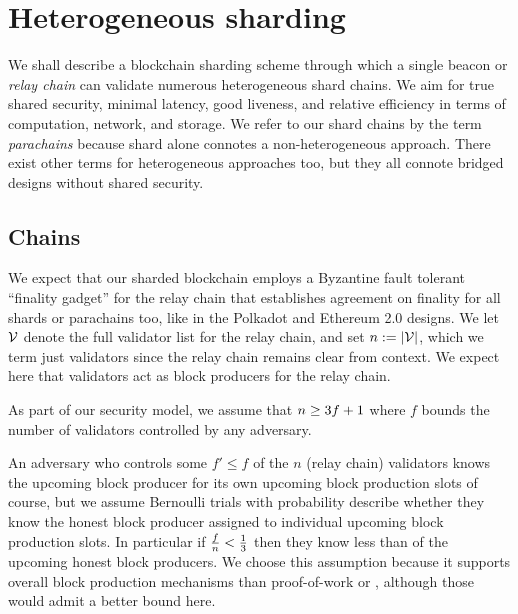 
\section{Heterogeneous sharding}

We shall describe a blockchain sharding scheme through which a single beacon or {\em relay chain} can validate numerous heterogeneous shard chains.  We aim for true shared security, minimal latency, good liveness, and relative efficiency in terms of computation, network, and storage.  We refer to our shard chains by the term {\em parachains} because shard alone connotes a non-heterogeneous approach.  There exist other terms for heterogeneous approaches too, but they all connote bridged designs without shared security.

\subsection{Chains}

We expect that our sharded blockchain employs a Byzantine fault tolerant ``finality gadget'' for the relay chain that establishes agreement on finality for all shards or parachains too, like in the Polkadot and Ethereum 2.0 designs.  We let $\mathcal{V}$ denote the full validator list for the relay chain, and set $n := |\mathcal{V}|$, which we term just validators since the relay chain remains clear from context.  We expect here that validators act as block producers for the relay chain.  

As part of our security model, we assume that $n \ge 3 f + 1$ where $f$ bounds the number of validators controlled by any adversary.

An adversary who controls some $f' \le f$ of the $n$ (relay chain) validators knows the upcoming block producer for its own upcoming block production slots of course, but we assume Bernoulli trials with probability  describe whether they know the honest block producer assigned to individual upcoming block production slots.  In particular if ${f \over n} < {1\over3}$ then they know less than  of the upcoming honest block producers.
We choose this assumption because it supports overall  block production mechanisms than proof-of-work or \cite{Praos}, although those would admit a better bound here. 

